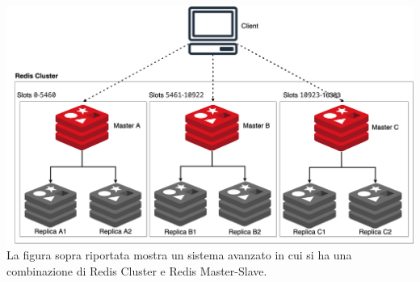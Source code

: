\includegraphics[width=1\textwidth]{img/cluster:master-slaveRedis}\\

La figura sopra riportata mostra un sistema avanzato in cui si ha una combinazione di Redis Cluster e Redis Master-Slave.